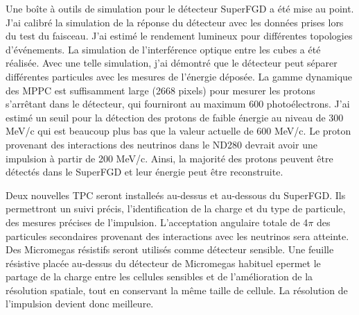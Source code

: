 \documentclass[../main.tex]{subfiles}
\begin{document}

Une boîte à outils de simulation pour le détecteur SuperFGD a été mise au point. J'ai calibré la simulation de la réponse du détecteur avec les données prises lors du test du faisceau. J'ai estimé le rendement lumineux pour différentes topologies d'événements. La simulation de l'interférence optique entre les cubes a été réalisée. Avec une telle simulation, j'ai démontré que le détecteur peut séparer différentes particules avec les mesures de l'énergie déposée. La gamme dynamique des MPPC est suffisamment large (2668 pixels) pour mesurer les protons s'arrêtant dans le détecteur, qui fourniront au maximum 600 photoélectrons. J'ai estimé un seuil pour la détection des protons de faible énergie au niveau de 300 MeV/c qui est beaucoup plus bas que la valeur actuelle de 600 MeV/c. Le proton provenant des interactions des neutrinos dans le ND280 devrait avoir une impulsion à partir de 200 MeV/c. Ainsi, la majorité des protons peuvent être détectés dans le SuperFGD et leur énergie peut être reconstruite.


Deux nouvelles TPC seront installeés au-dessus et au-dessous du SuperFGD. Ils permettront un suivi précis, l'identification de la charge et du type de particule, des mesures précises de l'impulsion. L'acceptation angulaire totale de 4$\pi$ des particules secondaires provenant des interactions avec les neutrinos sera atteinte. Des Micromegas résistifs seront utilisés comme détecteur sensible. Une feuille résistive placée au-dessus du détecteur de Micromegas habituel epermet le partage de la charge entre les cellules sensibles et de l'amélioration de la résolution spatiale, tout en conservant la même taille de cellule. La résolution de l'impulsion devient donc meilleure.
\end{document}
